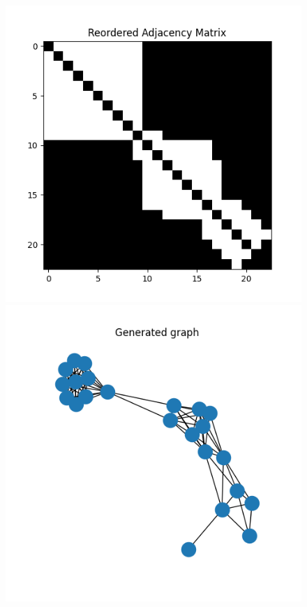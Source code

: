 \documentclass[a4paper]{article}
\begin{document}
% 
% 



\begin{figure}[ht!]
    \centering
    \begin{minipage}{.45\textwidth}
      \includegraphics[width=0.7\linewidth]{figures/graph_00_adjacency_matrix.png}
    \end{minipage}\hfill
    \begin{minipage}{.45\textwidth}
      \includegraphics[width=0.7\linewidth]{figures/graph_00_generated_graph.png}
    \end{minipage}
  

\end{figure}
\end{document}
